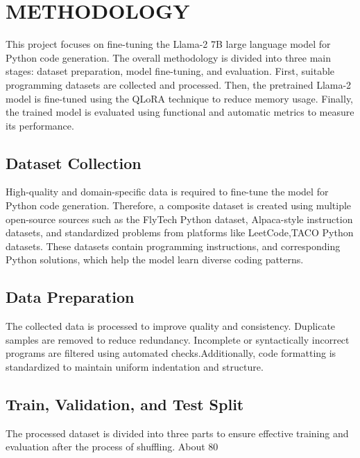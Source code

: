 \chapter{METHODOLOGY}
\begin{normaltext}
This project focuses on fine-tuning the Llama-2 7B large language model for Python code generation. The overall methodology is divided into three main stages: dataset preparation, model fine-tuning, and evaluation. First, suitable programming datasets are collected and processed. Then, the pretrained Llama-2 model is fine-tuned using the QLoRA technique to reduce memory usage. Finally, the trained model is evaluated using functional and automatic metrics to measure its performance.
\vspace{18pt}
\section{Dataset Collection}
High-quality and domain-specific data is required to fine-tune the model for Python code generation. Therefore, a composite dataset is created using multiple open-source sources such as the FlyTech Python dataset, Alpaca-style instruction datasets, and standardized problems from platforms like LeetCode,TACO Python datasets. These datasets contain programming instructions, and corresponding Python solutions, which help the model learn diverse coding patterns.
\section{Data Preparation}
The collected data is processed to improve quality and consistency. Duplicate samples are removed to reduce redundancy. Incomplete or syntactically incorrect programs are filtered using automated checks.Additionally, code formatting is standardized to maintain uniform indentation and structure. 
\section{Train, Validation, and Test Split}
The processed dataset is divided into three parts to ensure effective training and evaluation after the process of shuffling. About 80%

\end{normaltext}

